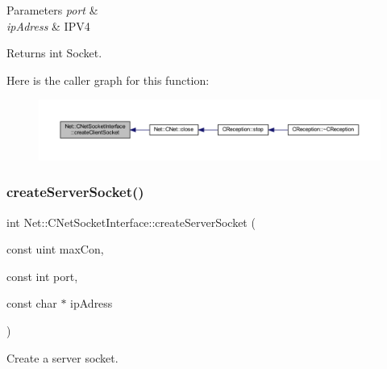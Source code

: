 \begin{DoxyParams}{Parameters}
{\em port} & \\
\hline
{\em ip\+Adress} & I\+P\+V4 \\
\hline
\end{DoxyParams}
\begin{DoxyReturn}{Returns}
int Socket. 
\end{DoxyReturn}
Here is the caller graph for this function\+:
\nopagebreak
\begin{figure}[H]
\begin{center}
\leavevmode
\includegraphics[width=350pt]{class_net_1_1_c_net_socket_interface_a52ca61f347f9f08cf0ad85e45f081906_icgraph}
\end{center}
\end{figure}
\mbox{\label{class_net_1_1_c_net_socket_interface_a250ab776d6ce77b1a905904dce7bf21f}} 
\subsubsection{\texorpdfstring{create\+Server\+Socket()}{createServerSocket()}}
{\footnotesize\ttfamily int Net\+::\+C\+Net\+Socket\+Interface\+::create\+Server\+Socket (\begin{DoxyParamCaption}\item[{const uint}]{max\+Con,  }\item[{const int}]{port,  }\item[{const char $\ast$}]{ip\+Adress }\end{DoxyParamCaption})\hspace{0.3cm}{\ttfamily [static]}}



Create a server socket. 


